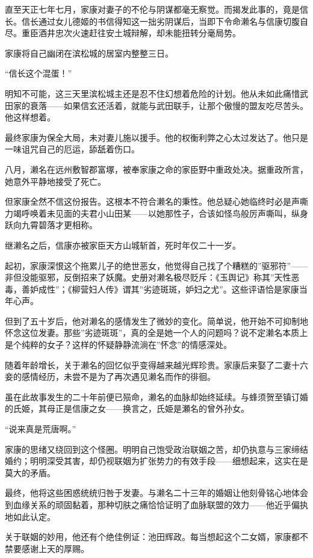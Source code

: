 \documentclass[
]{article}
\begin{document}
直至天正七年七月，家康对妻子的不伦与阴谋都毫无察觉。而揭发此事的，竟是信长。信长通过女儿德姬的书信得知这一拙劣阴谋后，当即下令命濑名与信康切腹自尽。重臣酒井忠次火速赶往安土城辩解，却未能扭转分毫局势。

家康将自己幽闭在滨松城的居室内整整三日。

``信长这个混蛋！''

明知不可能，这三天里滨松城主还是忍不住幻想着危险的计划。他从未如此痛惜武田家的衰落------如果信玄还活着，就能与武田联手，让那个傲慢的盟友吃尽苦头。他这样想着。

最终家康为保全大局，未对妻儿施以援手。他的权衡利弊之心太过发达了。他只是一味诅咒自己的厄运，舔舐着伤口。

八月，濑名在远州敷智郡富塚，被奉家康之命的家臣野中重政处决。据重政所言，她意外平静地接受了死亡。

但家康全然不信这份报告。这根本不符合濑名的秉性。他总疑心她临终时必是声嘶力竭呼唤着未见面的夫君小山田某------以她那性子，合该如怪鸟般厉声嘶叫，纵身跃向九霄碧落才更相称。

继濑名之后，信康亦被家臣天方山城斩首，死时年仅二十一岁。

起初，家康深恨这个拖累儿子的绝世恶女，他觉得自己找了个糟糕的''驱邪符''------非但没能驱邪，反倒招来了妖魔。史册对濑名极尽贬斥：《玉舆记》称其''天性恶毒，善妒成性''；《柳营妇人传》谓其''劣迹斑斑，妒妇之尤''。这些评语恰是家康当年心声。

但到了五十岁后，他对濑名的感情发生了微妙的变化。简单说，他开始不可抑制地怀念这位发妻。那些''劣迹斑斑''，真的全是她一个人的问题吗？说不定濑名本质上是个纯粹的女子？这样的怀疑静静流淌在''怀念''的情感深处。

随着年龄增长，关于濑名的回忆似乎变得越来越光辉珍贵。家康后来娶了二妻十六妾的感情经历，未尝不是为了再次遇见濑名而作的徘徊。

虽在此故事发生的二十年前便已殒命，濑名的血脉却始终延续。与蜂须贺至镇订婚的氏姫，其母正是信康之女------换言之，氏姫是瀬名的曾外孙女。

``说来真是荒唐啊。''

家康的思绪又绕回到这个怪圈。明明自己饱受政治联姻之苦，却仍执意与三家缔结婚约；明明深受其害，却仍视联姻为扩张势力的有效手段------细想起来，这实在是莫大的矛盾。

最终，他将这些困惑统统归咎于发妻。与濑名二十三年的婚姻让他刻骨铭心地体会到血缘关系的顽固黏着，那种切肤之痛恰恰证明了血脉联盟的效力------他近乎偏执地如此认定。

关于联姻的妙用，他还有个绝佳例证：池田辉政。每当想起这个二女婿，家康都不禁要感谢上天的厚赐。
\end{document}
